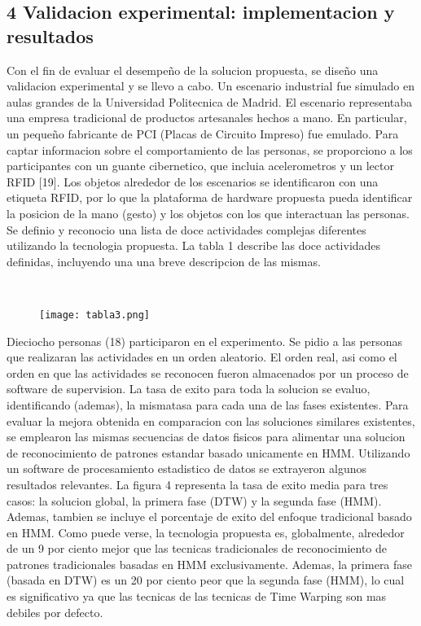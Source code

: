 \documentclass{paper}
\begin{document}
\subsection*{4 Validacion experimental: implementacion y resultados}

Con el fin de evaluar el desempeño de la solucion propuesta, se diseño una validacion experimental y se llevo a cabo. Un escenario industrial fue simulado en aulas grandes de la Universidad Politecnica de Madrid. El escenario representaba una empresa tradicional de productos artesanales hechos a mano. En particular, un pequeño fabricante de PCI (Placas de Circuito Impreso) fue emulado.
Para captar informacion sobre el comportamiento de las personas, se proporciono a los participantes con un guante cibernetico, que incluia acelerometros y un lector RFID [19]. Los objetos alrededor de los escenarios se identificaron con una etiqueta RFID, por lo que la plataforma de hardware propuesta pueda identificar la posicion de la mano (gesto) y los objetos con los que interactuan las personas.
Se definio y reconocio una lista de doce actividades complejas diferentes utilizando la tecnologia propuesta. La tabla 1 describe las doce actividades definidas, incluyendo una una breve descripcion de las mismas. 

\ \begin{figure}[H]
    \centering
    \texttt{[image: tabla3.png]}
    \label{fig:my_label}
\end{figure}


Dieciocho personas (18) participaron en el experimento. Se pidio a las personas que realizaran las actividades en un orden aleatorio. El orden real, asi como el orden en que las actividades se reconocen fueron almacenados por un proceso de software de supervision. La tasa de exito para toda la solucion se evaluo, identificando (ademas), la mismatasa para cada una de las fases existentes.
Para evaluar la mejora obtenida en comparacion con las soluciones similares existentes, se emplearon las mismas secuencias de datos fisicos para alimentar una solucion de reconocimiento de patrones estandar basado unicamente en HMM. Utilizando un software de procesamiento estadistico de datos se extrayeron algunos resultados relevantes.
La figura 4 representa la tasa de exito media para tres casos: la solucion global, la primera fase (DTW) y la segunda fase (HMM). Ademas, tambien se incluye el porcentaje de exito del enfoque tradicional basado en HMM. Como puede verse, la tecnologia propuesta es, globalmente, alrededor de un 9 por ciento mejor que las tecnicas tradicionales de reconocimiento de patrones
tradicionales basadas en HMM exclusivamente. Ademas, la primera fase (basada en DTW) es un 20 por ciento peor que la segunda fase (HMM), lo cual es significativo ya que las tecnicas de las tecnicas de Time Warping son mas debiles por defecto. 
\end{document}
